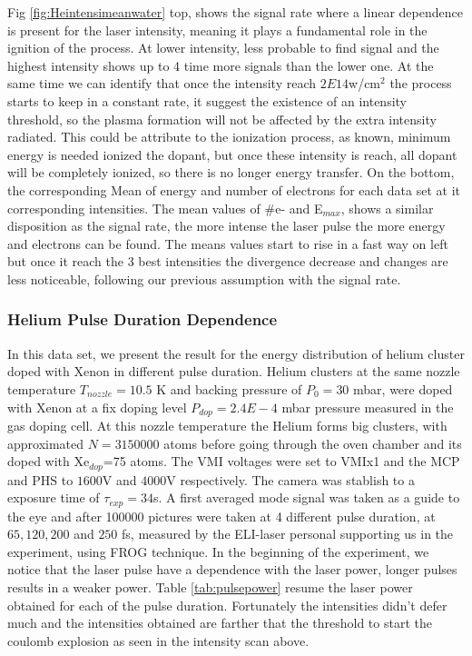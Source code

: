 Fig \ref{fig:Heintensimeanwater} top, shows the signal rate where a linear dependence is present for the laser intensity, meaning it  plays a fundamental role in the ignition of the process. At lower intensity, less probable to find signal and the highest intensity shows up to 4 time more signals than the lower one. At the same time we can identify that once the intensity reach $2E14$w/cm$^{2}$ the process starts to keep in a constant rate, it suggest the existence of  an intensity threshold, so the plasma formation will not be affected by the extra intensity radiated. This could be attribute to the ionization process, as known, minimum energy is needed ionized the dopant, but once these intensity is reach, all dopant will be completely ionized, so there is no longer energy transfer. 
On the bottom, the corresponding Mean of energy and number of electrons for each data set at it corresponding intensities. The mean values of $\#$e- and E$_{max}$, shows a  similar  disposition as the signal rate, the more intense the laser pulse the more energy and electrons can be found. The means values start to rise in a fast way on left but once it reach the 3 best intensities the divergence decrease and changes are less noticeable, following our previous assumption with the signal rate.

 
\subsubsection{Helium Pulse Duration Dependence}
 
In this data set, we present the result for the energy distribution of helium cluster doped with Xenon in different pulse duration.  Helium clusters at the same nozzle temperature $T_{nozzle}=10.5$ K and  backing pressure of $P_{0}=30$ mbar, were doped with Xenon at a fix doping level $P_{dop}=2.4E-4$ mbar pressure measured in the gas doping cell. At this nozzle temperature the Helium forms big clusters, with approximated $N=3150000$ atoms before going through the oven chamber and its doped with Xe$_{dop}$=75 atoms. The VMI voltages were set to VMIx1 and the MCP and PHS to $1600$V and $4000$V respectively. The camera was stablish to a exposure time of $\tau_{exp}=34$s. A first averaged mode signal was taken as a guide to the eye and after 100000 pictures were taken at 4 different pulse duration, at $65, 120, 200$ and $250$  fs, measured by the ELI-laser personal supporting us in the experiment, using FROG technique.
In the beginning of the experiment, we notice that the laser pulse have a dependence with the laser power,  longer pulses results in a weaker power. Table \ref{tab:pulsepower} resume the laser power obtained for each of the pulse duration. Fortunately the intensities didn't defer much and the intensities obtained are farther that the threshold to start the coulomb explosion as seen in the intensity scan above.
  
